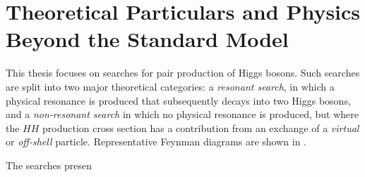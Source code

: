 \chapter{Theoretical Particulars and Physics Beyond the Standard Model}
This thesis focuses on searches for pair production of Higgs bosons. Such searches are split into two 
major theoretical categories: a \emph{resonant search}, in which a physical resonance is produced that subsequently
decays into two Higgs bosons, and a \emph{non-resonant search} in which no physical resonance is produced, but
where the $HH$ production cross section has a contribution from an exchange of a \emph{virtual} or \emph{off-shell}
particle. Representative Feynman diagrams are shown in .




The searches presen

